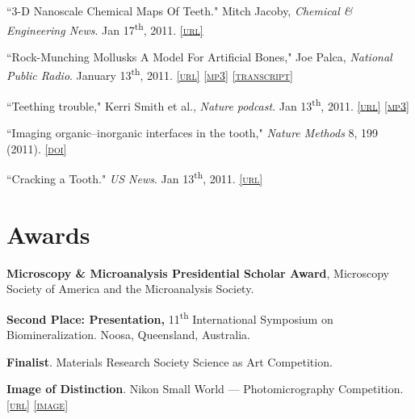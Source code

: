  ``3-D Nanoscale Chemical Maps Of Teeth." Mitch Jacoby, \emph{Chemical \& Engineering News}. Jan 17\textsuperscript{th}, 2011. \href{http://pubs.acs.org/cen/science/89/8903scic1.html?utm_source=feedburner&utm_medium=feed&utm_campaign=Feed%3A+cen_nano+%28Chemical+And+Engineering+News+NanoFocus%29}{\textsc{\footnotesize{[url]}}}

``Rock-Munching Mollusks A Model For Artificial Bones," Joe Palca, \emph{National Public Radio}. January 13\textsuperscript{th}, 2011. \href{http://www.npr.org/2011/01/13/132859853/rock-munching-mollusks-a-model-for-artificial-bones}{\textsc{\footnotesize{[url]}}} \href{http://lylegordon.ca/audio/npr-2011-01-13.mp3}{\textsc{\footnotesize{[mp3]}}}  \href{http://lylegordon.ca/nprtranscript.html}{\textsc{\footnotesize{[transcript]}}}

``Teething trouble," Kerri Smith et al., \emph{Nature podcast}. Jan 13\textsuperscript{th}, 2011. \href{http://www.nature.com/nature/podcast/index-2011-01-13.html}{\textsc{\footnotesize{[url]}}} \href{http://lylegordon.ca/audio/nature-2011-01-13.mp3}{\textsc{\footnotesize{[mp3]}}}

``Imaging organic--inorganic interfaces in the tooth," \emph{Nature Methods} 8, 199 (2011). \href{http://dx.doi.org/10.1038/nmeth0311-199}{\textsc{\footnotesize{[doi]}}}

 ``Cracking a Tooth." \emph{US News}. Jan 13\textsuperscript{th}, 2011. \href{http://www.usnews.com/science/articles/2011/01/13/cracking-a-tooth}{\textsc{\footnotesize{[url]}}}
\endgroup

\section*{Awards}
\textbf{Microscopy \& Microanalysis Presidential Scholar Award}, Microscopy Society of America and the Microanalysis Society.

\begingroup\setlength{\parskip}{0.1cm}
\textbf{Second Place: Presentation,} 11\textsuperscript{th} International Symposium on Biomineralization. Noosa, Queensland, Australia.

\textbf{Finalist}. Materials Research Society Science as Art Competition.

\textbf{Image of Distinction}. Nikon Small World --- Photomicrography Competition. \href{http://www.nikonsmallworld.com/detail/year/2009/66}{\textsc{\footnotesize{[url]}}} \href{http://lylegordon.ca/nikon2009.jpg}{\textsc{\footnotesize{[image]}}}

